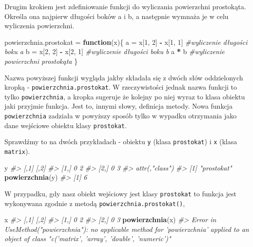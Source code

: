 \documentclass[paper=6in:9in,pagesize=pdftex,headinclude=on,footinclude=on,10pt]{scrbook}
\newenvironment{Shaded}{\begin{snugshade}}{\end{snugshade}}
\newcommand{\CommentTok}[1]{\textcolor[rgb]{0.56,0.35,0.01}{\textit{#1}}}
\newcommand{\ControlFlowTok}[1]{\textcolor[rgb]{0.13,0.29,0.53}{\textbf{#1}}}
\newcommand{\DecValTok}[1]{\textcolor[rgb]{0.00,0.00,0.81}{#1}}
\newcommand{\KeywordTok}[1]{\textcolor[rgb]{0.13,0.29,0.53}{\textbf{#1}}}
\newcommand{\NormalTok}[1]{#1}
\newcommand{\OperatorTok}[1]{\textcolor[rgb]{0.81,0.36,0.00}{\textbf{#1}}}
\newcommand{\StringTok}[1]{\textcolor[rgb]{0.31,0.60,0.02}{#1}}
\begin{document}
Drugim krokiem jest zdefiniowanie funkcji do wyliczania powierzchni prostokąta.
Określa ona najpierw długości boków a i b, a następnie wymnaża je w celu wyliczenia powierzchni.

\begin{Shaded}
\begin{Highlighting}[]
\NormalTok{powierzchnia.prostokat =}\StringTok{ }\ControlFlowTok{function}\NormalTok{(x)\{}
\NormalTok{  a =}\StringTok{ }\NormalTok{x[}\DecValTok{1}\NormalTok{, }\DecValTok{2}\NormalTok{] }\OperatorTok{-}\StringTok{ }\NormalTok{x[}\DecValTok{1}\NormalTok{, }\DecValTok{1}\NormalTok{] }\CommentTok{#wyliczenie długości boku a}
\NormalTok{  b =}\StringTok{ }\NormalTok{x[}\DecValTok{2}\NormalTok{, }\DecValTok{2}\NormalTok{] }\OperatorTok{-}\StringTok{ }\NormalTok{x[}\DecValTok{2}\NormalTok{, }\DecValTok{1}\NormalTok{] }\CommentTok{#wyliczenie długości boku b}
\NormalTok{  a }\OperatorTok{*}\StringTok{ }\NormalTok{b                 }\CommentTok{#wyliczenie powierzchni prostokąta}
\NormalTok{\}}
\end{Highlighting}
\end{Shaded}

Nazwa powyższej funkcji wygląda jakby składała się z dwóch słów oddzielonych kropką - \texttt{powierzchnia.prostokat}.
W rzeczywistości jednak nazwa funkcji to tylko \texttt{powierzchnia}, a kropka sugeruje że kolejny po niej wyraz to klasa obiektu jaki przyjmie funkcja.
Jest to, innymi słowy, definicja metody.
Nowa funkcja \texttt{powierzchnia} zadziała w powyższy sposób tylko w wypadku otrzymania jako dane wejściowe obiektu klasy \texttt{prostokat}.

Sprawdźmy to na dwóch przykładach - obiektu \texttt{y} (klasa \texttt{prostokat}) i \texttt{x} (klasa \texttt{matrix}).

\begin{Shaded}
\begin{Highlighting}[]
\NormalTok{y}
\CommentTok{#>      [,1] [,2]}
\CommentTok{#> [1,]    0    2}
\CommentTok{#> [2,]    0    3}
\CommentTok{#> attr(,"class")}
\CommentTok{#> [1] "prostokat"}
\KeywordTok{powierzchnia}\NormalTok{(y)}
\CommentTok{#> [1] 6}
\end{Highlighting}
\end{Shaded}

W przypadku, gdy nasz obiekt wejściowy jest klasy \texttt{prostokat} to funkcja jest wykonywana zgodnie z metodą \texttt{powierzchnia.prostokat()},

\begin{Shaded}
\begin{Highlighting}[]
\NormalTok{x}
\CommentTok{#>      [,1] [,2]}
\CommentTok{#> [1,]    0    2}
\CommentTok{#> [2,]    0    3}
\KeywordTok{powierzchnia}\NormalTok{(x)}
\CommentTok{#> Error in UseMethod("powierzchnia"): no applicable method for 'powierzchnia' applied to an object of class "c('matrix', 'array', 'double', 'numeric')"}
\end{Highlighting}
\end{Shaded}
\end{document}
